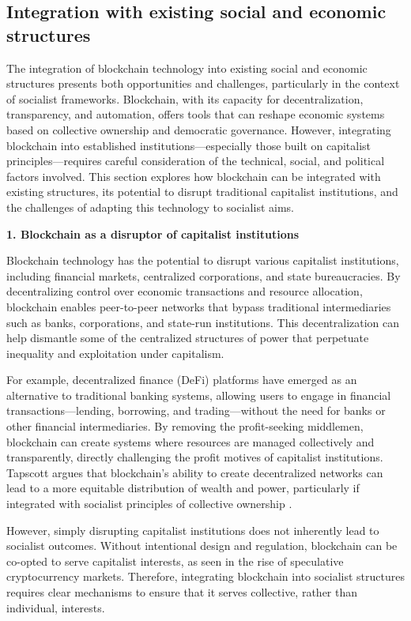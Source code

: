 \begin{refsection}
\subsection{Integration with existing social and economic structures}

The integration of blockchain technology into existing social and economic structures presents both opportunities and challenges, particularly in the context of socialist frameworks. Blockchain, with its capacity for decentralization, transparency, and automation, offers tools that can reshape economic systems based on collective ownership and democratic governance. However, integrating blockchain into established institutions—especially those built on capitalist principles—requires careful consideration of the technical, social, and political factors involved. This section explores how blockchain can be integrated with existing structures, its potential to disrupt traditional capitalist institutions, and the challenges of adapting this technology to socialist aims.

\textbf{1. Blockchain as a disruptor of capitalist institutions}

Blockchain technology has the potential to disrupt various capitalist institutions, including financial markets, centralized corporations, and state bureaucracies. By decentralizing control over economic transactions and resource allocation, blockchain enables peer-to-peer networks that bypass traditional intermediaries such as banks, corporations, and state-run institutions. This decentralization can help dismantle some of the centralized structures of power that perpetuate inequality and exploitation under capitalism.

For example, decentralized finance (DeFi) platforms have emerged as an alternative to traditional banking systems, allowing users to engage in financial transactions—lending, borrowing, and trading—without the need for banks or other financial intermediaries. By removing the profit-seeking middlemen, blockchain can create systems where resources are managed collectively and transparently, directly challenging the profit motives of capitalist institutions. Tapscott argues that blockchain’s ability to create decentralized networks can lead to a more equitable distribution of wealth and power, particularly if integrated with socialist principles of collective ownership \cite[pp.~190-192]{tapscott2016}.

However, simply disrupting capitalist institutions does not inherently lead to socialist outcomes. Without intentional design and regulation, blockchain can be co-opted to serve capitalist interests, as seen in the rise of speculative cryptocurrency markets. Therefore, integrating blockchain into socialist structures requires clear mechanisms to ensure that it serves collective, rather than individual, interests.


\end{refsection}
